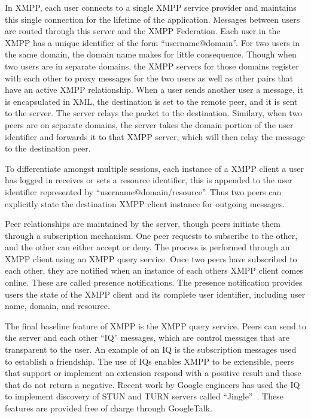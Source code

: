 \documentclass[conference]{IEEEtran}
\begin{document}
In XMPP, each user connects to a single XMPP service provider and maintains
this single connection for the lifetime of the application.  Messages between
users are routed through this server and the XMPP Federation.  Each user in the
XMPP has a unique identifier of the form ``username@domain''.  For two users in
the same domain, the domain name makes for little consequence.  Though when two
users are in separate domains, the XMPP servers for those domains register with
each other to proxy messages for the two users as well as other pairs that have
an active XMPP relationship.  When a user sends another user a message, it is
encapsulated in XML, the destination is set to the remote peer, and it is sent
to the server.  The server relays the packet to the destination.  Similary,
when two peers are on separate domains, the server takes the domain portion of
the user identifier and forwards it to that XMPP server, which will then relay
the message to the destination peer.

To differentiate amongst multiple sessions, each instance of a XMPP client a
user has logged in receives or sets a resource identifier, this is appended to
the user identifier represented by ``username@domain/resource''.  Thus two peers
can explicitly state the destination XMPP client instance for outgoing
messages.

Peer relationships are maintained by the server, though peers initiate them
through a subscription mechanism.  One peer requests to subscribe to the other,
and the other can either accept or deny.  The process is performed through an
XMPP client using an XMPP query service.  Once two peers have subscribed to
each other, they are notified when an instance of each others XMPP client comes
online.  These are called presence notifications.  The presence notification
provides users the state of the XMPP client and its complete user identifier,
including user name, domain, and resource.

The final baseline feature of XMPP is the XMPP query service.  Peers can send
to the server and each other ``IQ'' messages, which are control messages that
are transparent to the user.  An example of an IQ is the subscription messages
used to establish a friendship.  The use of IQs enables XMPP to be extensible,
peers that support or implement an extension respond with a positive result and
those that do not return a negative.  Recent work by Google engineers has used
the IQ to implement discovery of STUN and TURN servers called
``Jingle''~\cite{jingle}.  These features are provided free of charge through
GoogleTalk.
\end{document}
